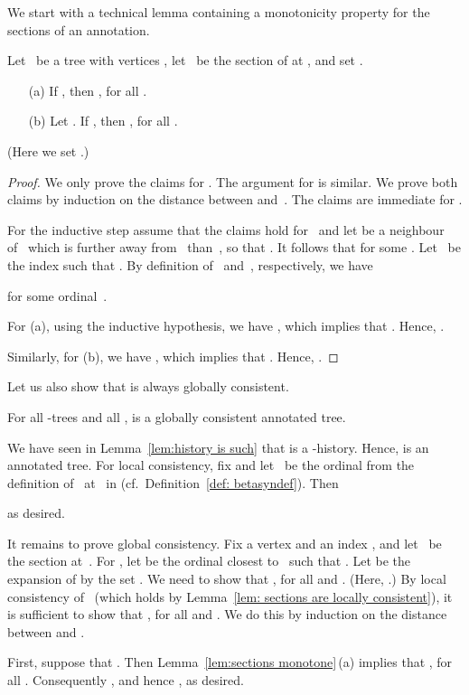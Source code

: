 \documentclass{LMCS}
\begin{document}
We start with a technical lemma containing a monotonicity property
for the sections of an annotation.
\begin{lem}\label{lem:sections monotone}
Let ~be a tree with vertices ,
let ~be the section of  at ,
and set .
\begin{enumerate}
\item[\normalfont(a)] If ,
  then , for all .
\item[\normalfont(b)] Let . If , then
  , for all .
\end{enumerate}
(Here we set .)
\end{lem}
\begin{proof}
We only prove the claims for . The argument for  is similar.
We prove both claims by induction on the distance between 
and~. The claims are immediate for .

For the inductive step assume that the claims hold for~
and let  be a neighbour of~ which is further away from~ than~,
so that .
It follows that  for some .
Let ~be the index such that .
By definition of ~and~, respectively, we have

for some ordinal~.

For (a), using the inductive hypothesis,
we have ,
which implies that .
Hence, .

Similarly, for (b), we have ,
which implies that .
Hence, .
\end{proof}

Let us also show that  is always globally consistent.
\begin{lem}\label{lem:annotated tree is such}
For all -trees  and all ,
 is a globally consistent annotated tree.
\end{lem}

\proof
We have seen in Lemma~\ref{lem:history is such} that  is a
-history.
Hence,  is an annotated tree.
For local consistency, fix  and let ~be the ordinal
from the definition of~
at~ in  (cf.~Definition~\ref{def: betasyndef}).
Then

as desired.

It remains to prove global consistency.
Fix a vertex  and an index ,
and let ~be the section at~.
For , let  be the ordinal closest to~
such that .
Let  be the expansion of 
by the set .
We need to show that
,
for all  and .
(Here, .)
By local consistency of~
(which holds by Lemma~\ref{lem: sections are locally consistent}),
it is sufficient to show that
,
for all  and .
We do this by induction on the distance between  and .

First, suppose that .
Then Lemma~\ref{lem:sections monotone}\,(a) implies that
, for all .
Consequently ,
and hence , as desired.
\end{document}
